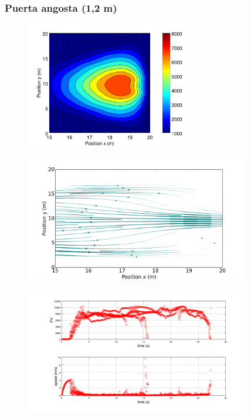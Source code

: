 \subsubsection{Puerta angosta (1,2 m)}

\begin{figure}[H]
    \centering
    \includegraphics[height=5.5cm]{figuras/press_225p_v4_onedoor_1_2.png}
    \caption[width=5cm]{\centering\textit{}}
    \label{sintesis}
\end{figure}

\begin{figure}[H]
    \centering
    \includegraphics[height=5.5cm]{figuras/flujo_door_1_2m.png}
    \caption[width=5cm]{\centering\textit{}}
    \label{sintesis}
\end{figure}

\begin{figure}[H]
    \centering
    \includegraphics[height=5.5cm]{figuras/pv_vel_t_100_1_2.png}
    \caption[width=5cm]{\centering\textit{}}
    \label{sintesis}
\end{figure}



